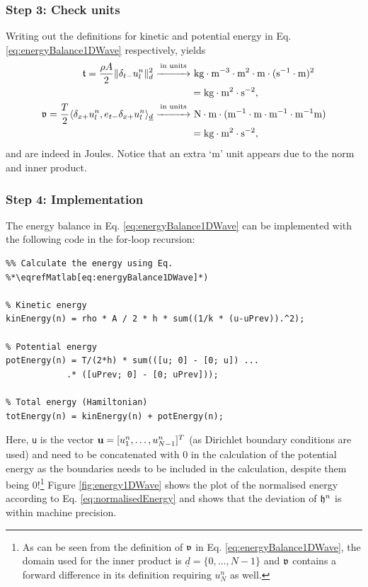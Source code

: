 {{\subsubsection{Step 3: Check units}
Writing out the definitions for kinetic and potential energy in Eq. \eqref{eq:energyBalance1DWave} respectively, yields
\begin{align*}
    \t = \frac{\rho A}{2}\lVert\dtm \uln\rVert^2_d \overset{\text{in units}}{\xrightarrow{\hspace*{1cm}}}& \ \text{kg}\cdot \text{m}^{-3} \cdot \text{m}^2\cdot \text{m} \cdot(\text{s}^{-1}\cdot \text{m})^{2}\\
    & = \text{kg}\cdot\text{m}^2\cdot\text{s}^{-2},\\
    \v = \frac{T}{2}\langle\dxp\uln, e_{t-}\dxp\uln\rangle_{\underline{d}}\overset{\text{in units}}{\xrightarrow{\hspace*{1cm}}}& \ \text{N} \cdot \text{m}\cdot (\text{m}^{-1}\cdot\text{m}\cdot \text{m}^{-1}\cdot\text{m}^{-1}\text{m}) \\
    & = \text{kg} \cdot \text{m}^2 \cdot \text{s}^{-2},
\end{align*}
and are indeed in Joules. Notice that an extra `m' unit appears due to the norm and inner product.

\subsubsection{Step 4: Implementation}
The energy balance in Eq. \eqref{eq:energyBalance1DWave} can be implemented with the following code in the for-loop recursion:

\setlstMAT
\begin{lstlisting}
%% Calculate the energy using Eq. %*\eqrefMatlab[eq:energyBalance1DWave]*) 

% Kinetic energy
kinEnergy(n) = rho * A / 2 * h * sum((1/k * (u-uPrev)).^2);

% Potential energy
potEnergy(n) = T/(2*h) * sum(([u; 0] - [0; u]) ...
            .* ([uPrev; 0] - [0; uPrev]));

% Total energy (Hamiltonian)
totEnergy(n) = kinEnergy(n) + potEnergy(n);
\end{lstlisting}
Here, \texttt{u} is the vector $\u = [u_1^n, \hdots, u_{N-1}^n]^T$ (as Dirichlet boundary conditions are used) and need to be concatenated with $0$ in the calculation of the potential energy as the boundaries needs to be included in the calculation, despite them being 0!\footnote{As can be seen from the definition of $\v$ in Eq. \eqref{eq:energyBalance1DWave}, the domain used for the inner product is $\underline{d} = \{0,\hdots, N-1\}$ and $\v$ contains a forward difference in its definition requiring $u_N^n$ as well.}
Figure \ref{fig:energy1DWave} shows the plot of the normalised energy according to Eq. \eqref{eq:normalisedEnergy} and shows that the deviation of $\h^n$ is within machine precision.
\begin{figure}[h]
    \centering
    \begin{tikzpicture}[->,node distance=3cm,
        thick,main node/.style={circle,draw}]
    

\end{tikzpicture}
\end{figure}}}
